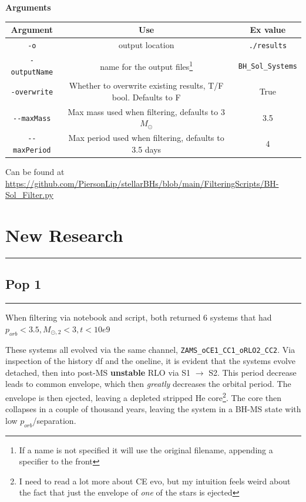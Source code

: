 \documentclass{article}
\theoremstyle{mytheoremstyle}
\theoremstyle{mytheoremstyle}
\theoremstyle{myproblemstyle}
\theoremstyle{myproblemstyle}
\begin{document}
\textbf{Arguments}
\begin{center}
\begin{tabular}{|c|c|c|}
\hline
 Argument & Use & Ex value \\
 \hline
 \verb|-o| & output location  & \verb|./results|\\
 \verb|-outputName| & name for the output files\footnote{If a name is not specified it will use the original filename, appending a specifier to the front}  & \verb|BH_Sol_Systems|\\
 \verb|-overwrite| & Whether to overwrite existing results, T/F bool. Defaults to F& True\\
 \verb|--maxMass| & Max mass used when filtering, defaults to 3\(M_\odot\)& 3.5\\
 \verb|--maxPeriod| & Max period used when filtering, defaults to 3.5 days & 4\\
\hline
\end{tabular}
\end{center}

Can be found at \url{https://github.com/PiersonLip/stellarBHs/blob/main/FilteringScripts/BH-Sol_Filter.py}

\pagebreak
\section{New Research}
\hrule
\vspace{.5cm}

\subsection{Pop 1}
\hrule
\vspace{.5cm}

When filtering via notebook and script, both returned 6 systems that had \(p_{orb} < 3.5, M_{\odot,2} < 3, t < 10e9\)

These systems all evolved via the same channel, \verb|ZAMS_oCE1_CC1_oRLO2_CC2|. Via inspection of the history df and the oneline, it is evident that the systems evolve detached, then into post-MS \textbf{unstable} RLO via S1 \(\rightarrow\) S2. This period decrease leads to common envelope, which then \textit{greatly} decreases the orbital period. The envelope is then ejected, leaving a depleted stripped He core\footnote{I need to read a lot more about CE evo, but my intuition feels weird about the fact that just the envelope of \textit{one} of the stars is ejected}. The core then collapses in a couple of thousand years, leaving the system in a BH-MS state with low \(p_{orb}\)/separation. 
\end{document}
